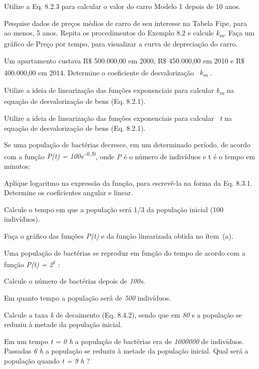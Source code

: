 \begin{exercicios}

    \exitem{} Utilize a Eq. 8.2.3 para calcular o valor do carro Modelo 1 depois de 10 anos.

	\exitem{} Pesquise dados de preços médios de carro de seu interesse na Tabela Fipe, para ao menos, 5 anos. Repita os procedimentos do Exemplo 8.2 e calcule \textit{k\textsubscript{m}}. Faça um gráfico de Preço por tempo, para visualizar a curva de depreciação do carro.

	\exitem{} Um apartamento custava R$\$$  500.000,00 em 2000, R$\$$  450.000,00 em 2010 e R$\$$  400.000,00 em 2014. Determine o coeficiente de desvalorização~ \textit{k\textsubscript{m}\textsuperscript{ }}.

	\exitem{} Utilize a ideia de linearização das funções exponenciais para calcular \textit{k\textsubscript{m}} na equação de desvalorização de bens (Eq. 8.2.1).

	\exitem{} Utilize a ideia de linearização das funções exponenciais para calcular~ \textit{t }na equação de desvalorização de bens (Eq. 8.2.1).

	\exitem{} Se uma população de bactérias decresce, em um determinado período, de acordo com a função \textit{P(t) = 100e\textsuperscript{-0,5t}}, onde \textit{P} é o número de indivíduos e t é o tempo em minutos:

	\exitem{} Aplique logaritmo na expressão da função, para escrevê-la na forma da Eq. 8.3.1. Determine os coeficientes angular e linear.

	\exitem{} Calcule o tempo em que a população será 1/3 da população inicial (100 indivíduos).

	\exitem{} Faça o gráfico das funções \textit{P(t)} e da função linearizada obtida no ítem~(a).  



	\exitem{} Uma população de bactérias se reproduz em função do tempo de acordo com a função  \textit{P(t) = 2\textsuperscript{t} :}

	\exitem{} Calcule o número de bactérias depois de \textit{100s}. 

	\exitem{} Em quanto tempo a população será de \textit{500} indivíduos.

	\exitem{} Calcule a taxa \textit{k} de decaimento (Eq. 8.4.2), sendo que em \textit{80} s a população se reduziu à metade da população inicial.

	\exitem{} Em um tempo \textit{t = 0 h} a população de bactérias era de \textit{1000000} de indivíduos. Passadas \textit{6 h} a população se reduziu à metade da população inicial. Qual será a população quando \textit{t = 9 h} ?


\end{exercicios}
